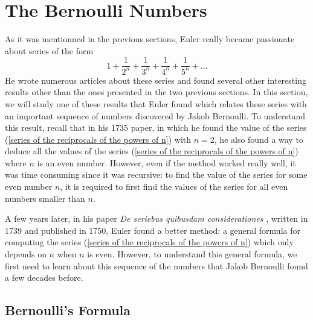 \section{The Bernoulli Numbers} \label{sec: bernoulli numbers}

As it was mentionned in the previous sections, Euler really became passionate about series of the form
\begin{equation}\label{series of the reciprocals of the powers of n}
    1 + \frac{1}{2^n} + \frac{1}{3^n} + \frac{1}{4^n} + \frac{1}{5^n} + \dots
\end{equation}
He wrote numerous articles about these series and found several other interesting results other than the ones presented in the two previous sections. In this section, we will study one of these results that Euler found which relates these series with an important sequence of numbers discovered by Jakob Bernoulli. To understand this result, recall that in his 1735 paper, in which he found the value of the series (\ref{series of the reciprocals of the powers of n}) with $n = 2$, he also found a way to deduce all the values of the series (\ref{series of the reciprocals of the powers of n}) where $n$ is an even number. However, even if the method worked really well, it was time consuming since it was recursive: to find the value of the series for some even number $n$, it is required to first find the values of the series for all even numbers smaller than $n$.

A few years later, in his paper \textit{De seriebus quibusdam considerationes} \cite{euler1750seriebus}, written in 1739 and published in 1750, Euler found a better method: a general formula for computing the series (\ref{series of the reciprocals of the powers of n}) which only depends on $n$ when $n$ is even. However, to understand this general formula, we first need to learn about this sequence of the numbers that Jakob Bernoulli found a few decades before.

\subsection*{Bernoulli's Formula}

